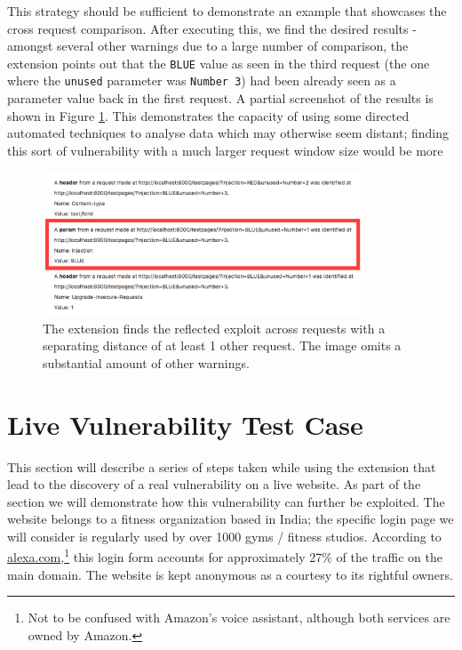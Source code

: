 This strategy should be sufficient to demonstrate an example that showcases the cross request comparison. After executing this, we find the desired results - amongst several other warnings due to a large number of comparison, the extension points out that the \texttt{BLUE} value as seen in the third request (the one where the \texttt{unused} parameter was \texttt{Number 3}) had been already seen as a parameter value back in the first request. A partial screenshot of the results is shown in Figure \ref{fig:cross_check_warnings}. This demonstrates the capacity of using some directed automated techniques to analyse data which may otherwise seem distant; finding this sort of vulnerability with a much larger request window size would be more 

\begin{figure}[h!]
	\centering
	\includegraphics[width=0.85\textwidth]{images/cross_request_warnings.png}
	\caption{The extension finds the reflected exploit across requests with a separating distance of at least 1 other request. The image omits a substantial amount of other warnings.}
	\label{fig:cross_check_warnings}
\end{figure}


\section{Live Vulnerability Test Case} \label{live_vulnerability}

This section will describe a series of steps taken while using the extension that lead to the discovery of a real vulnerability on a live website. As part of the section we will demonstrate how this vulnerability can further be exploited. The website belongs to a fitness organization based in India; the specific login page we will consider is regularly used by over 1000 gyms / fitness studios. According to \url{alexa.com},\footnote{Not to be confused with Amazon's voice assistant, although both services are owned by Amazon.} this login form accounts for approximately 27\% of the traffic on the main domain. The website is kept anonymous as a courtesy to its rightful owners. \\ 

